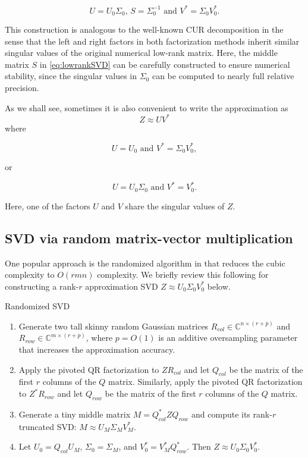 \begin{equation}
  \label{eq:lowrankSVD}
  U=U_0\Sigma_0,\, S = \Sigma_0^{-1} \text{ and } V^*=\Sigma_0V_0^*.
\end{equation}

This construction is analogous to the well-known {CUR} decomposition \cite{mahoney2009cur} in the sense that the left and right factors in both factorization methods inherit similar singular values of the original numerical low-rank matrix. Here, the middle matrix $S$ in \eqref{eq:lowrankSVD} can be carefully constructed to ensure numerical stability, since the singular values in $\Sigma_0$
can be computed to nearly full relative precision.

As we shall see, sometimes it is also convenient to write the approximation as
\[
Z\approx UV^*
\]
where

\begin{equation}
  \label{eq:lowrankSVD2}
  U=U_0 \text{ and } V^*=\Sigma_0V_0^*,
\end{equation}

or

\begin{equation}
  \label{eq:lowrankSVD3}
  U=U_0 \Sigma_0\text{ and }
  V^*=V_0^*.
\end{equation}

Here, one of the factors $U$ and $V$ share the singular values of $Z$.

\subsection{SVD via random matrix-vector multiplication}
\label{sec:RandSVD}

One popular approach is the randomized algorithm in \cite{Rec1} that reduces the cubic complexity to $O(rmn)$ complexity. We briefly review this following \cite{Rec1} for constructing a rank-$r$ approximation SVD $Z\approx U_0 \Sigma_0 V_0^*$ below.

\begin{algo}{Randomized {SVD}}
\begin{enumerate}
\item Generate two tall skinny random Gaussian matrices $R_{col} \in
  \mathbb{C}^{n\times (r+p)}$ and $R_{row}\in \mathbb{C}^{m\times
    (r+p)}$, where $p=O(1)$ is an additive oversampling parameter that increases the approximation accuracy.
\item
  Apply the pivoted QR factorization to $ZR_{col}$ and let $Q_{col}$ be the matrix of the first $r$ columns of the $Q$ matrix. Similarly, apply the pivoted QR factorization to $Z^*R_{row}$ and let $Q_{row}$ be the matrix of the first $r$ columns of the $Q$ matrix.
\item
  Generate a tiny middle matrix $M=Q_{col}^*ZQ_{row}$ and compute its rank-$r$ truncated {SVD}: $M \approx U_M \Sigma_M V_M^*$.
\item
  Let $U_0 = Q_{col} U_M$, $\Sigma_0 = \Sigma_M$, and $V_0^* = V_M^* Q_{row}^*$.  Then $Z \approx U_0\Sigma_0V_0^*$.
\end{enumerate}
\end{algo}

